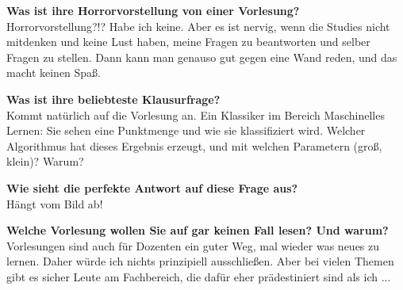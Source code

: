 \textbf{Was ist ihre Horrorvorstellung von einer Vorlesung?}\\
Horrorvorstellung?!? Habe ich keine. Aber es ist nervig, wenn die Studies nicht mitdenken und keine Lust haben, meine Fragen zu beantworten und selber Fragen zu stellen. Dann kann man genauso gut gegen eine Wand reden, und das macht keinen Spaß. 

\textbf{Was ist ihre beliebteste Klausurfrage?}\\
Kommt natürlich auf die Vorlesung an. Ein Klassiker im Bereich Maschinelles Lernen: Sie sehen eine Punktmenge und wie sie klassifiziert wird. Welcher Algorithmus hat dieses Ergebnis erzeugt, und mit welchen Parametern (groß, klein)? Warum? 

\textbf{Wie sieht die perfekte Antwort auf diese Frage aus?}\\
Hängt vom Bild ab! 

\textbf{Welche Vorlesung wollen Sie auf gar keinen Fall lesen? Und warum?}\\
Vorlesungen sind auch für Dozenten ein guter Weg, mal wieder was neues zu lernen. Daher würde ich nichts prinzipiell ausschließen. Aber bei vielen Themen gibt es sicher Leute am Fachbereich, die dafür eher prädestiniert sind als ich ... 